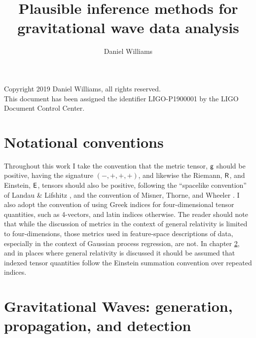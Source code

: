 \documentclass[oneside, oldfontcommands]{kentigern}
\title{Plausible inference methods for gravitational wave data analysis}
\author{Daniel Williams}
\theoremstyle{definition}
\begin{document}
\openright
\frontmatter
\thesistitle
\newpage \newpage

\begin{abstract}

\end{abstract}
\newpage

Copyright 2019 Daniel Williams, all rights reserved.\\

This document has been assigned the identifier LIGO-P1900001 by the LIGO Document Control Center.
\newpage

%



\newpage
\tableofcontents
\newpage
\listoffigures
\newpage
\listoftables
\newpage

\printglossary[type=\acronymtype]



\newpage
\chapter{Notational conventions}
\label{sec:notation-conventions}

Throughout this work I take the convention that the metric tensor, $\mathsf{g}$ should be positive, having the signature $(-,+,+,+)$, and likewise the Riemann, $\mathsf{R}$, and Einstein, $\mathsf{E}$, tensors should also be positive, following the ``spacelike convention'' of Landau \& Lifshitz \cite{1975ctf..book.....L}, and the convention of Misner, Thorne, and Wheeler \cite{mtw}. I also adopt the convention of using Greek indices for four-dimensional tensor quantities, such as 4-vectors, and latin indices otherwise. The reader should note that while the discussion of metrics in the context of general relativity is limited to four-dimensions, those metrics used in feature-space descriptions of data, especially in the context of Gaussian process regression, are not.
In chapter \ref{cha:intro}, and in places where general relativity is discussed it should be assumed that indexed tensor quantities follow the Einstein summation convention over repeated indices.

\mainmatter
\glsresetall
\chapter[Gravitational Waves: Generation, propagation, and detection]{Gravitational Waves: generation, propagation, and detection}
\label{cha:intro}
\end{document}
